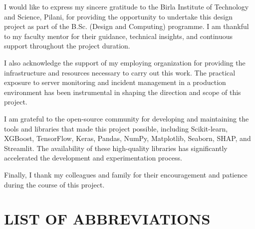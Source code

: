 \documentclass[12pt,letterpaper]{report}
\begin{document}
\thispagestyle{plain}

I would like to express my sincere gratitude to the Birla Institute of Technology and Science, Pilani, for providing the opportunity to undertake this design project as part of the B.Sc. (Design and Computing) programme. I am thankful to my faculty mentor for their guidance, technical insights, and continuous support throughout the project duration.

I also acknowledge the support of my employing organization for providing the infrastructure and resources necessary to carry out this work. The practical exposure to server monitoring and incident management in a production environment has been instrumental in shaping the direction and scope of this project.

I am grateful to the open-source community for developing and maintaining the tools and libraries that made this project possible, including Scikit-learn, XGBoost, TensorFlow, Keras, Pandas, NumPy, Matplotlib, Seaborn, SHAP, and Streamlit. The availability of these high-quality libraries has significantly accelerated the development and experimentation process.

Finally, I thank my colleagues and family for their encouragement and patience during the course of this project.

\newpage


\tableofcontents
\newpage

\listoffigures
\newpage

\listoftables
\newpage

\chapter*{LIST OF ABBREVIATIONS}
\end{document}
